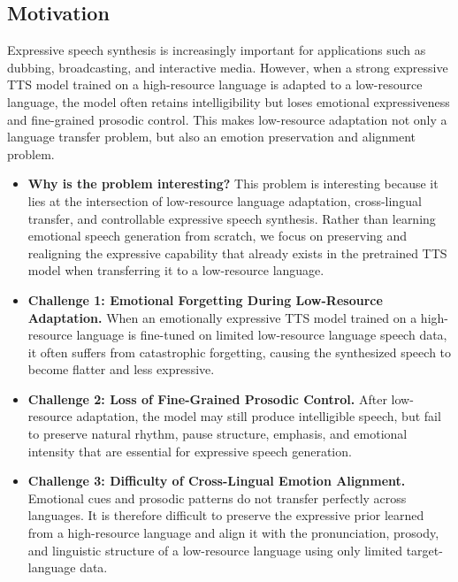 \subsection{Motivation}

Expressive speech synthesis is increasingly important for applications such as dubbing, broadcasting, and interactive media. However, when a strong expressive TTS model trained on a high-resource language is adapted to a low-resource language, the model often retains intelligibility but loses emotional expressiveness and fine-grained prosodic control. This makes low-resource adaptation not only a language transfer problem, but also an emotion preservation and alignment problem.

\begin{itemize}
    \item \textbf{Why is the problem interesting?} 
    This problem is interesting because it lies at the intersection of low-resource language adaptation, cross-lingual transfer, and controllable expressive speech synthesis. Rather than learning emotional speech generation from scratch, we focus on preserving and realigning the expressive capability that already exists in the pretrained TTS model when transferring it to a low-resource language.
    
    \item \textbf{Challenge 1: Emotional Forgetting During Low-Resource Adaptation.} When an emotionally expressive TTS model trained on a high-resource language is fine-tuned on limited low-resource language speech data, it often suffers from catastrophic forgetting, causing the synthesized speech to become flatter and less expressive.
    
    \item \textbf{Challenge 2: Loss of Fine-Grained Prosodic Control.} After low-resource adaptation, the model may still produce intelligible speech, but fail to preserve natural rhythm, pause structure, emphasis, and emotional intensity that are essential for expressive speech generation.
    
    \item \textbf{Challenge 3: Difficulty of Cross-Lingual Emotion Alignment.} Emotional cues and prosodic patterns do not transfer perfectly across languages. It is therefore difficult to preserve the expressive prior learned from a high-resource language and align it with the pronunciation, prosody, and linguistic structure of a low-resource language using only limited target-language data.
    

\end{itemize}
